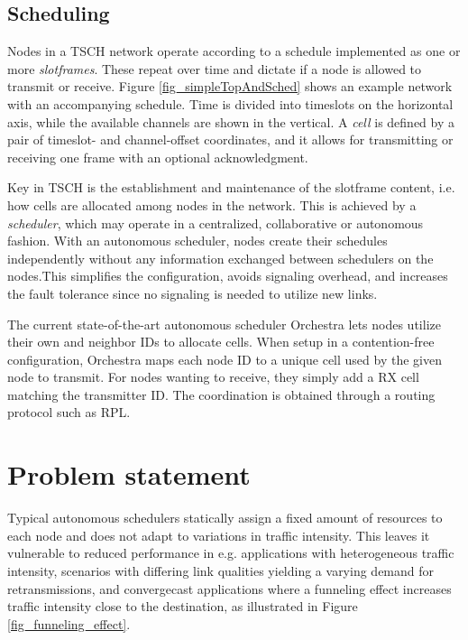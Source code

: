 \documentclass[journal,comsoc]{IEEEtran}
\begin{document}
\subsection{Scheduling}

Nodes in a TSCH network operate according to a schedule implemented as one or more \textit{slotframes}. These repeat over time and dictate if a node is allowed to transmit or receive. Figure \ref{fig_simpleTopAndSched} shows an example network with an accompanying schedule. Time is divided into timeslots on the horizontal axis, while the available channels are shown in the vertical. A \textit{cell} is defined by a pair of timeslot- and channel-offset coordinates, and it allows for transmitting or receiving one frame with an optional acknowledgment.

Key in TSCH is the establishment and maintenance of the slotframe content, i.e. how cells are allocated among nodes in the network. This is achieved by a \textit{scheduler}, which may operate in a centralized, collaborative or autonomous fashion. With an autonomous scheduler, nodes create their schedules independently without any information exchanged between schedulers on the nodes.This simplifies the configuration, avoids signaling overhead, and increases the fault tolerance since no signaling is needed to utilize new links.

The current state-of-the-art autonomous scheduler Orchestra \cite{OrchestraRobustMeshDuquennoy2015} lets nodes utilize their own and neighbor IDs to allocate cells. When setup in a contention-free configuration, Orchestra maps each node ID to a unique cell used by the given node to transmit. For nodes wanting to receive, they simply add a RX cell matching the transmitter ID. The coordination is obtained through a routing protocol such as RPL.

\section{Problem statement}

Typical autonomous schedulers statically assign a fixed amount of resources to each node and does not adapt to variations in traffic intensity. This leaves it vulnerable to reduced performance in e.g. applications with heterogeneous traffic intensity, scenarios with differing link qualities yielding a varying demand for retransmissions, and convergecast applications where a funneling effect increases traffic intensity close to the destination, as illustrated in Figure \ref{fig_funneling_effect}.
\end{document}
